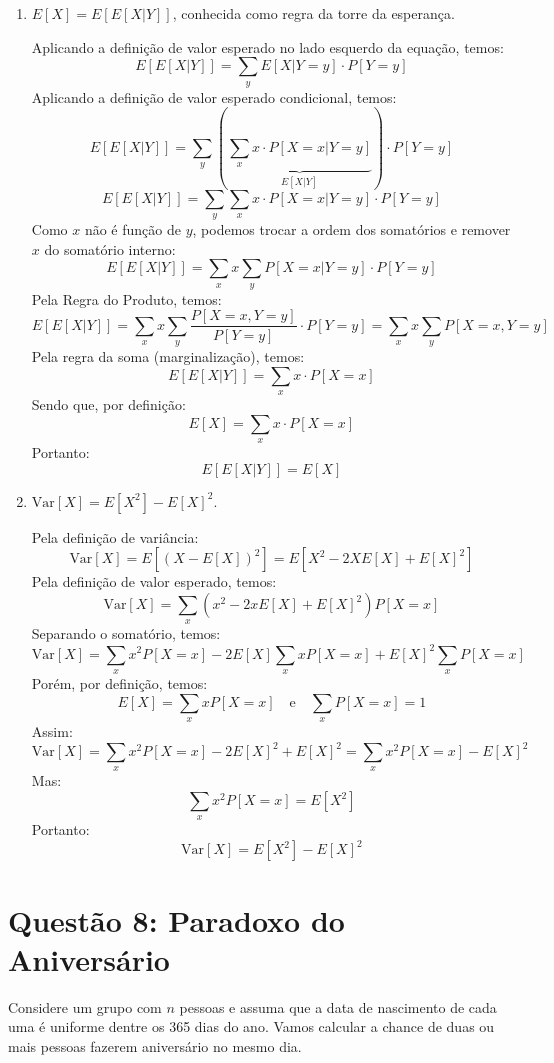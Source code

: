 \documentclass[12 pt]{article}
\begin{document}
\begin{enumerate}
    \item $E[X] = E[E[X|Y]]$, conhecida como regra da torre da esperança.
    \begin{tcolorbox}[colframe=black, title=Resposta:]
        Aplicando a definição de valor esperado no lado esquerdo da equação, temos:
            $$E[E[X|Y]] = \sum_y E[X|Y=y] \cdot P[Y=y] $$ 
        Aplicando a definição de valor esperado condicional, temos:
            $$E[E[X|Y]] = \sum_y \left( \underbrace{\sum_x x \cdot P[X=x|Y=y]}_{E[X|Y]} \right)\cdot P[Y=y]$$
            $$E[E[X|Y]] = \sum_y \sum_x x \cdot P[X=x|Y=y] \cdot P[Y=y]$$
        Como $x$ não é função de $y$, podemos trocar a ordem dos somatórios e remover $x$ do somatório interno:
            $$E[E[X|Y]] = \sum_x x \sum_y P[X=x|Y=y] \cdot P[Y=y]$$
        Pela Regra do Produto, temos:
            $$E[E[X|Y]] = \sum_x x \sum_y \frac{P[X=x , Y=y]}{P[Y=y]} \cdot P[Y=y] = \sum_x x \sum_y P[X=x , Y=y]$$
        Pela regra da soma (marginalização), temos:
            $$E[E[X|Y]] = \sum_x x \cdot P[X=x]$$
        Sendo que, por definição:
            $$E[X] = \sum_x x \cdot P[X=x]$$
        Portanto:
            $$\boxed{E[E[X|Y]] = E[X]}$$

    \end{tcolorbox}
    \newpage
    \item $\text{Var}[X] = E[X^2] - E[X]^2$.
    \begin{tcolorbox}[colframe=black, title=Resposta:]
        Pela definição de variância:
        $$\text{Var}[X] = E[(X - E[X])^2] = E[X^2 - 2X E[X] + E[X]^2]$$
        Pela definição de valor esperado, temos:
        $$\text{Var}[X] = \sum_x (x^2 - 2x E[X] + E[X]^2) P[X=x]$$
        Separando o somatório, temos:
        $$\text{Var}[X] = \sum_x x^2 P[X=x] - 2 E[X] \sum_x x P[X=x] + E[X]^2 \sum_x P[X=x]$$
        Porém, por definição, temos:
        $$E[X] = \sum_x x P[X=x] \quad \text{e} \quad \sum_x P[X=x] = 1$$
        Assim:
        $$\text{Var}[X] = \sum_x x^2 P[X=x] - 2 E[X]^2 + E[X]^2 = \sum_x x^2 P[X=x] - E[X]^2$$
        Mas:
        $$\sum_x x^2 P[X=x] = E[X^2] $$
        Portanto:
        $$\boxed{\text{Var}[X] = E[X^2] - E[X]^2}$$
    \end{tcolorbox}
\end{enumerate}

\section*{Questão 8: Paradoxo do Aniversário}
Considere um grupo com $n$ pessoas e assuma que a data de nascimento de cada uma é uniforme dentre
os 365 dias do ano. Vamos calcular a chance de duas ou mais pessoas fazerem aniversário no mesmo dia.
\end{document}
